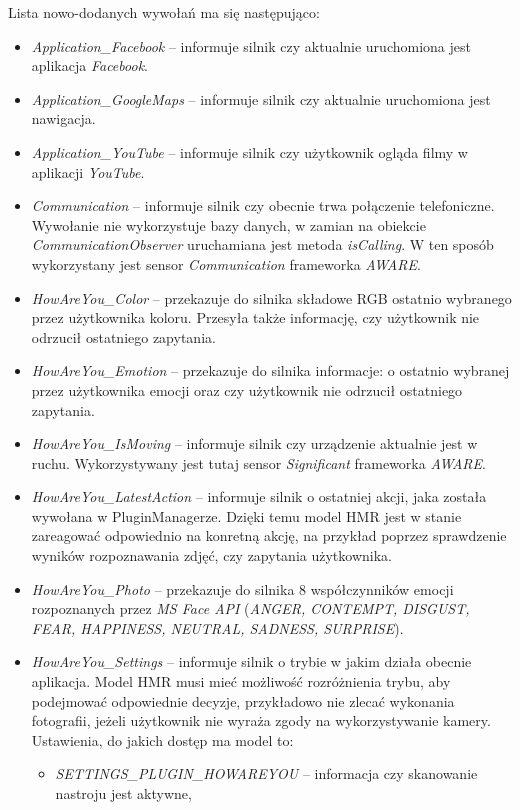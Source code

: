 Lista nowo-dodanych wywołań ma się następująco: 

\begin{itemize}
	\item \textit{Application\_Facebook} -- informuje silnik czy aktualnie uruchomiona jest aplikacja \textit{Facebook}.
	
	\item \textit{Application\_GoogleMaps} -- informuje silnik czy aktualnie uruchomiona jest nawigacja.
	
	\item \textit{Application\_YouTube} -- informuje silnik czy użytkownik ogląda filmy w aplikacji \textit{YouTube}.
	
	\item \textit{Communication} -- informuje silnik czy obecnie trwa połączenie telefoniczne. Wywołanie nie wykorzystuje bazy danych, w zamian na obiekcie \textit{CommunicationObserver} uruchamiana jest metoda \textit{isCalling}. W ten sposób wykorzystany jest sensor \textit{Communication} frameworka \textit{AWARE}.
	
	\item \textit{HowAreYou\_Color} -- przekazuje do silnika składowe RGB ostatnio wybranego przez użytkownika koloru. Przesyła także informację, czy użytkownik nie odrzucił ostatniego zapytania.
	
	\item \textit{HowAreYou\_Emotion} -- przekazuje do silnika informacje: o ostatnio wybranej przez użytkownika emocji oraz czy użytkownik nie odrzucił ostatniego zapytania.
	
	\item \textit{HowAreYou\_IsMoving} -- informuje silnik czy urządzenie aktualnie jest w ruchu. Wykorzystywany jest tutaj sensor \textit{Significant} frameworka \textit{AWARE}.
	
	\item \textit{HowAreYou\_LatestAction} -- informuje silnik o ostatniej akcji, jaka została wywołana w PluginManagerze. Dzięki temu model HMR jest w stanie zareagować odpowiednio na konretną akcję, na przykład poprzez sprawdzenie wyników rozpoznawania zdjęć, czy zapytania użytkownika.
	
	\item \textit{HowAreYou\_Photo} -- przekazuje do silnika 8 współczynników emocji rozpoznanych przez \textit{MS Face API} (\textit{ANGER, CONTEMPT, DISGUST, FEAR, HAPPINESS, NEUTRAL, SADNESS, SURPRISE}).
	
	\item \textit{HowAreYou\_Settings} -- informuje silnik o trybie w jakim działa obecnie aplikacja. Model HMR musi mieć możliwość rozróżnienia trybu, aby podejmować odpowiednie decyzje, przykładowo nie zlecać wykonania fotografii, jeżeli użytkownik nie wyraża zgody na wykorzystywanie kamery. Ustawienia, do jakich dostęp ma model to:
	\begin{itemize}
		\item \textit{SETTINGS\_PLUGIN\_HOWAREYOU} -- informacja czy skanowanie nastroju jest aktywne, 		 
		

\end{itemize}
\end{itemize}
